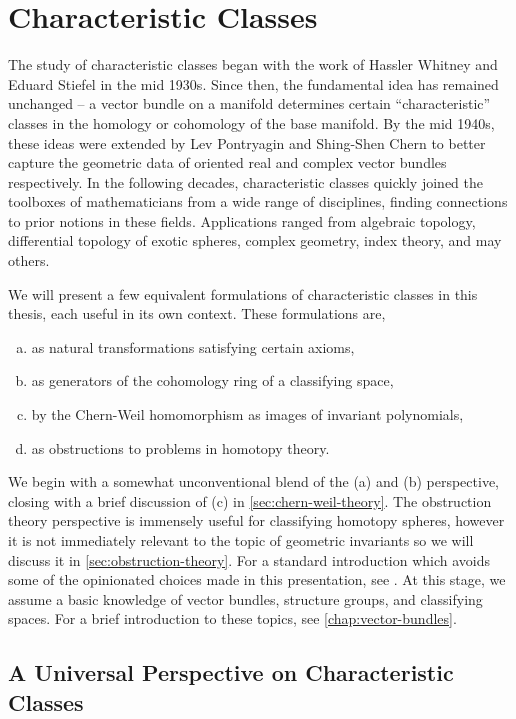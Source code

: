 \pagebreak
\section{Characteristic Classes}
The study of characteristic classes began with the work of Hassler Whitney and Eduard Stiefel in the mid 1930s. Since then, the fundamental idea has remained unchanged -- a vector bundle on a manifold determines certain ``characteristic'' classes in the homology or cohomology of the base manifold.
By the mid 1940s, these ideas were extended by Lev Pontryagin and Shing-Shen Chern to better capture the geometric data of oriented real and complex vector bundles respectively. In the following decades, characteristic classes quickly joined the toolboxes of mathematicians from a wide range of disciplines, finding connections to prior notions in these fields.
Applications ranged from algebraic topology, differential topology of exotic spheres, complex geometry, index theory, and may others.

We will present a few equivalent formulations of characteristic classes in this thesis, each useful in its own context. These formulations are,
\begin{enumerate}[(a)]
	\item as natural transformations satisfying certain axioms,
	\item as generators of the cohomology ring of a classifying space,
	\item by the Chern-Weil homomorphism as images of invariant polynomials,
	\item as obstructions to problems in homotopy theory.
\end{enumerate}
We begin with a somewhat unconventional blend of the (a) and (b) perspective, closing with a brief discussion of (c) in \cref{sec:chern-weil-theory}. The obstruction theory perspective is immensely useful for classifying homotopy spheres, however it is not immediately relevant to the topic of geometric invariants so we will discuss it in \cref{sec:obstruction-theory}. For a standard introduction which avoids some of the opinionated choices made in this presentation, see \cite{milnorstasheff1974}.
At this stage, we assume a basic knowledge of vector bundles, structure groups, and classifying spaces. For a brief introduction to these topics, see \cref{chap:vector-bundles}.

\subsection{A Universal Perspective on Characteristic Classes}\label{sec:axiomatic-characteristic-classes}

